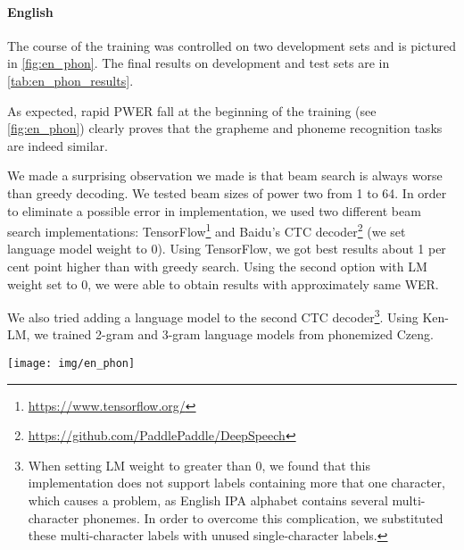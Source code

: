 \paragraph{English}
The course of the training was controlled on two development sets and is pictured in \cref{fig:en_phon}. The final results on development and test sets are in \cref{tab:en_phon_results}. 

As expected, rapid PWER fall at the beginning of the training (see \cref{fig:en_phon}) clearly proves that the grapheme and phoneme recognition tasks are indeed similar.

We made a surprising observation we made is that beam search is always worse than greedy decoding. We tested beam sizes of power two from 1 to 64. In order to eliminate a possible error in implementation, we used two different beam search implementations: TensorFlow\footnote{\url{https://www.tensorflow.org/}} and Baidu's CTC decoder\footnote{\url{https://github.com/PaddlePaddle/DeepSpeech}} (we set language model weight to 0). Using TensorFlow, we got best results about 1 per cent point higher than with greedy search. Using the second option with LM weight set to 0, we were able to obtain results with approximately same WER. 

We also tried adding a language model to the second CTC decoder\footnote{When setting LM weight to greater than 0, we found that this implementation does not support labels containing more that one character, which causes a problem, as English IPA alphabet contains several multi-character phonemes. In order to overcome this complication, we substituted these multi-character labels with unused single-character labels.}. Using Ken-LM, we trained 2-gram and 3-gram language models from phonemized Czeng. 


\begin{figure*}[t]
	\texttt{[image: img/en\_phon]}
	\caption{Evaluations on phonemized Libri Speech dev clean and Common Voice dev.}
	\label{fig:en_phon}
\end{figure*}

